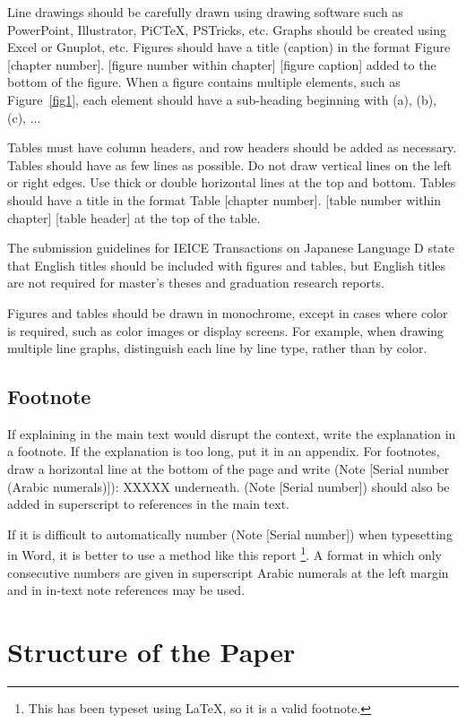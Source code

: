 Line drawings should be carefully drawn using drawing software such as PowerPoint, Illustrator, PiC\TeX, PSTricks, etc. Graphs should be created using Excel or Gnuplot, etc. Figures should have a title (caption) in the format Figure [chapter number]. [figure number within chapter] [figure caption] added to the bottom of the figure. When a figure contains multiple elements, such as Figure~\ref{fig1}, each element should have a sub-heading beginning with (a), (b), (c), ...

Tables must have column headers, and row headers should be added as necessary. Tables should have as few lines as possible. Do not draw vertical lines on the left or right edges. Use thick or double horizontal lines at the top and bottom. Tables should have a title in the format Table [chapter number]. [table number within chapter] [table header] at the top of the table.

The submission guidelines for IEICE Transactions on Japanese Language D state that English titles should be included with figures and tables, but English titles are not required for master's theses and graduation research reports.

Figures and tables should be drawn in monochrome, except in cases where color is required, such as color images or display screens. For example, when drawing multiple line graphs, distinguish each line by line type, rather than by color.

\section{Footnote}
If explaining in the main text would disrupt the context, write the explanation in a footnote. If the explanation is too long, put it in an appendix. For footnotes, draw a horizontal line at the bottom of the page and write (Note [Serial number (Arabic numerals)]): XXXXX underneath. (Note [Serial number]) should also be added in superscript to references in the main text.

If it is difficult to automatically number (Note [Serial number]) when typesetting in Word, it is better to use a method like this report \footnote{This has been typeset using \LaTeX, so it is a valid footnote.}. A format in which only consecutive numbers are given in superscript Arabic numerals at the left margin and in in-text note references may be used.

\chapter{Structure of the Paper}
